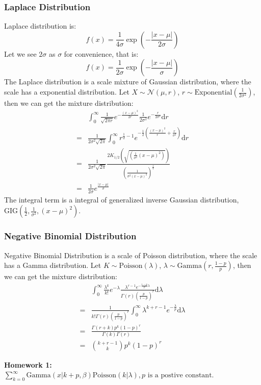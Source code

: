 \documentclass[11pt]{article}
\def\MN{{\mathcal N}}
\begin{document}
\subsubsection{Laplace Distribution}
Laplace distribution is:
$$f(x) = \frac{1}{4\sigma}\exp(-\frac{|x-\mu|}{2\sigma})$$
Let we see $2\sigma$ as $\sigma$ for convenience, that is:
$$f(x) = \frac{1}{2\sigma}\exp(-\frac{|x-\mu|}{\sigma})$$
The Laplace distribution is a scale mixture of Gaussian distribution, where the scale has a exponential distribution.
Let $X \sim \MN(\mu, r)$, $r \sim \mbox{Exponential}(\frac{1}{2\sigma^2})$, then we can get the mixture distribution:
\[\begin{split} &
\int_0^\infty \frac{1}{\sqrt{2\pi r}} e^{-\frac{(x-\mu)^2}{2r}}
\frac{1}{2\sigma^2} e^{-\frac{r}{2\sigma^2}} \mathrm{d}r  \\
 = & \frac{1}{2\sigma^2 \sqrt{2\pi}}  \int_0^\infty
 r^{\frac{1}{2} - 1} e^{-\frac{1}{2} \left( \frac{(x-\mu)^2}{r} + \frac{r}{\sigma^2}\right)} \mathrm{d}r  \\
 = & \frac{1}{2\sigma^2 \sqrt{2\pi}} \frac{2K_{1/2}\left(\sqrt{(\frac{1}{\sigma^2}(x-\mu)^2)}\right)}{(\frac{1}{\sigma^2(x-\mu)^2})^{\frac{1}{4}}} \\
 = &\frac{1}{2\sigma} e^{\frac{|x-\mu|}{\sigma}}
\end{split}\]
The integral term is a integral of generalized inverse Gaussian distribution, $\mbox{GIG}(\frac{1}{2},\frac{1}{\sigma^2},(x-\mu)^2)$.

\subsubsection{Negative Binomial Distribution}
Negative Binomial Distribution is a scale of Poisson distribution, where the scale has a Gamma distribution.
Let $K \sim \mbox{Poisson}(\lambda)$, $\lambda \sim \mbox{Gamma}(r, \frac{1-p}{p})$, then we can get the mixture distribution:
\[\begin{split}
&  \int_0^\infty \frac{\lambda^k}{k!} e^{-\lambda}
\frac{\lambda^{r-1} e^{-\frac{1-p}{p} \lambda}}{\Gamma(r) (\frac{p}{1-p})^r} \mathrm{d}\lambda \\
= & \frac{1}{k! \Gamma(r) (\frac{p}{1-p})^r}  \int_0^\infty  \lambda^{k+r-1}  e^{-\frac{\lambda}{p}} \mathrm{d}\lambda \\
=&\frac{\Gamma(r+k)p^k(1-p)^r}{\Gamma(k)\Gamma(r)}\\
= & {k+r-1 \choose k} p^k (1-p)^r
\end{split}\]

\textbf{Homework 1:}   $\sum\limits_{k=0}^\infty \mbox{Gamma}(x | k+p, \beta) \mbox{Poisson} (k | \lambda),  p\mbox{ is a postive constant}$.
\end{document}
